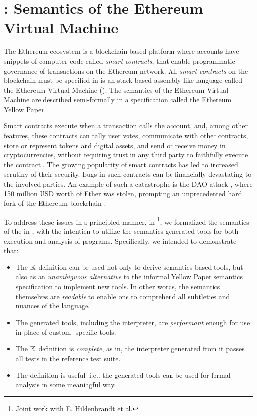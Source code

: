\section{\KEVM: Semantics of the Ethereum Virtual Machine}\label{sec:kevm}

The Ethereum ecosystem is a blockchain-based platform where accounts
have snippets of computer code called \emph{smart contracts}, that
enable programmatic governance of transactions on the Ethereum network.
All \emph{smart contracts} on the blockchain
must be specified in is an stack-based assembly-like language called
the Ethereum Virtual Machine (\EVM{}). The semantics of the
Ethereum Virtual Machine are described semi-formally in a specification
called the Ethereum Yellow Paper \cite{WoodReport14}.

Smart contracts execute when a transaction calls the account, and, among other features,
these contracts can tally user votes, communicate with other contracts,
store or represent tokens and digital assets, and send or receive money in
cryptocurrencies, without requiring trust in any third party to faithfully
execute the contract \cite{SzaboReport94,PetersBook16}.
The growing popularity of smart contracts has led to increased scrutiny of their security.
Bugs in such contracts can be financially devastating to the involved parties.
An example of such a catastrophe is the DAO attack \cite{delCastilloReport16},
 where 150 million USD worth of Ether was stolen,
 prompting an unprecedented hard fork of the Ethereum blockchain
 \cite{DaianReport16}.

To address these issues in a principled manner, in \cite{HildenbrandtCSF18}
\footnote{Joint work with E. Hildenbrandt et al.},
we formalized the semantics of the \EVM{} in \K{}, with the intention to
utilize the semantics-generated tools for both execution and analysis of \KEVM{}
programs. Specifically, we intended to demonstrate that:

\begin{itemize}
  \item The $\mathbb{K}$ definition can be used not only to derive semantics-based
  tools, but also as an \emph{unambiguous alternative} to the
  informal Yellow Paper semantics specification to implement new tools. In other
  words, the semantics themselves are \emph{readable} to enable one to
  comprehend all subtleties and nuances of the language.
  \item The generated tools, including the interpreter, are \emph{performant}
  enough for use in place of custom \EVM{}-specific tools.
  \item  The $\mathbb{K}$ definition is \emph{complete}, as in, the interpreter
  generated from it passes all tests in the reference test suite.
  \item The definition is useful, i.e., the generated tools can be used for
  formal analysis in some meaningful way.
\end{itemize}

